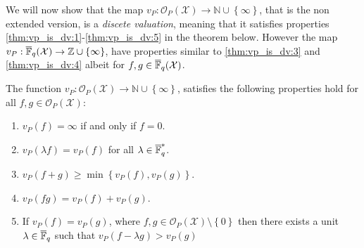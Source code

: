 We will now show that the map $v_{P}: \mathcal{O}_P(\mathcal{X}) \to \mathbb{N} \cup \left\{\infty\right\}$, that is the non extended version, is a \textit{discete valuation}, meaning that it satisfies properties \ref{thm:vp_is_dv:1}-\ref{thm:vp_is_dv:5} in the theorem below. However the map $v_{P}: \overline{\mathbb{F}}_{q}(\mathcal{X}) \to \mathbb{Z} \cup \left\{\infty\right\}$, have properties similar to \ref{thm:vp_is_dv:3} and \ref{thm:vp_is_dv:4} albeit for $f, g \in \overline{\mathbb{F}}_{q}(\mathcal{X})$.
\begin{theorem}\label{thm:vp_is_dv}
  The function $v_{P}: \mathcal{O}_P(\mathcal{X}) \to \mathbb{N} \cup \left\{\infty\right\}$, satisfies the following properties hold for all $f, g \in \mathcal{O}_{P}(\mathcal{X})$:
  \begin{enumerate}
    \item $v_P(f) = \infty$ if and only if $f = 0$. \label{thm:vp_is_dv:1}
    \item $v_P(\lambda f) = v_P(f)$ for all $\lambda \in \overline{\mathbb{F}}_{q}^{*}$.\label{thm:vp_is_dv:2}
    \item $v_{P}(f + g) \geq \min \left\{v_P(f), v_P(g)\right\}$.\label{thm:vp_is_dv:3}
    \item $v_P(fg) = v_P(f) + v_P(g)$.\label{thm:vp_is_dv:4}
    \item If $v_{P}(f) = v_P(g)$, where $f, g \in \mathcal{O}_{P}(\mathcal{X}) \setminus \left\{0\right\}$ then there exists a unit $\lambda \in \overline{\mathbb{F}}_{q}$ such that $v_P(f - \lambda g) > v_{P}(g)$ \label{thm:vp_is_dv:5}
  \end{enumerate}
\end{theorem}

